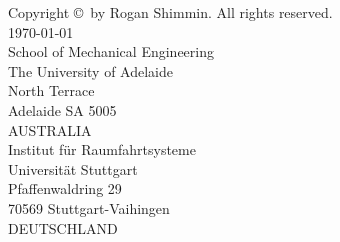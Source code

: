\newpage\thispagestyle{empty}
{\setlength\parindent{0pt}

Copyright \copyright\the\year\ by Rogan Shimmin. All rights reserved.\\[2cm]

\today\\[2cm]

School of Mechanical Engineering\\
The University of Adelaide\\
North Terrace \\
Adelaide SA 5005\\
AUSTRALIA\\[2cm]

Institut f\"{u}r Raumfahrtsysteme\\
Universit\"{a}t Stuttgart\\
Pfaffenwaldring 29\\
70569 Stuttgart-Vaihingen\\
DEUTSCHLAND
}

